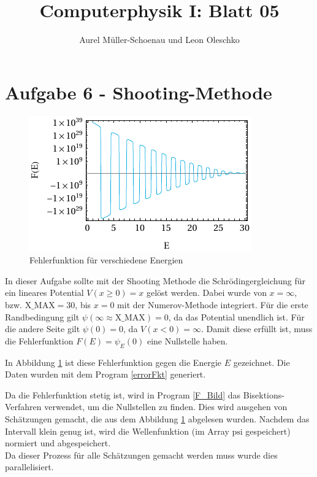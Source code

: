 


\setcounter{secnumdepth}{0}



\title{Computerphysik I: Blatt 05}
\author{Aurel Müller-Schoenau und Leon Oleschko}
\maketitle

\section{Aufgabe 6 - Shooting-Methode}
\begin{figure}[h!]
	\centering
	\includegraphics[scale = 1.388888888]{img/errorFunction.pdf}
	\caption{Fehlerfunktion für verschiedene Energien}
	\label{fig:shooting}
\end{figure}
In dieser Aufgabe sollte mit der Shooting Methode die Schrödingergleichung für ein lineares Potential $V(x\geq 0)=x$ gelöst werden. 
Dabei wurde von $x=\infty$, bzw. $\text{X\_MAX}=30$, bis $x=0$ mit der Numerov-Methode integriert.
Für die erste Randbedingung gilt $\psi(\infty\approx\text{X\_MAX})=0$, da das Potential unendlich ist.
Für die andere Seite gilt $\psi(0)=0$, da $V(x<0)=\infty$.
Damit diese erfüllt ist, muss die Fehlerfunktion $F(E) = \psi_E(0)$ eine Nullstelle haben.

In Abbildung \ref{fig:shooting} ist diese Fehlerfunktion gegen die Energie $E$ gezeichnet.
Die Daten wurden mit dem Program \ref{errorFkt} generiert.
\clearpage

Da die Fehlerfunktion stetig ist, wird in Program \ref{F_Bild} das Bisektions-Verfahren verwendet, um die Nullstellen zu finden.
Dies wird ausgehen von Schätzungen gemacht, die aus dem Abbildung \ref{fig:shooting} abgelesen wurden.
Nachdem das Intervall klein genug ist, wird die Wellenfunktion (im Array $\text{psi}$ gespeichert) normiert und abgespeichert.\\
Da dieser Prozess für alle Schätzungen gemacht werden muss wurde dies parallelisiert.

